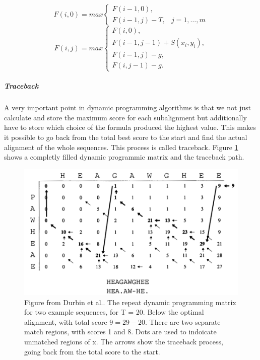 \begin{equation}
F(i,0) = max \left\{ \begin{array}{lr}F(i-1,0),&\\F(i-1,j)-T,& j=1,\dots,m\end{array}\right. 
\label{eq:firstrow}
\end{equation}
\begin{equation}
F(i,j) = max \left\{ \begin{array}{lr}F(i,0),\\F(i-1,j-1)+S(x_i,y_i),\\F(i-1,j)-g,\\F(i,j-1)-g.\end{array}\right.
\label{eq:otherrows}
\end{equation}
		
\subparagraph{Traceback}
A very important point in dynamic programming algorithms is that we not just calculate and store the maximum score for each subalignment but additionally have to store which choice of the formula produced the highest value.
This makes it possible to go back from the total best score to the start and find the actual alignment of the whole sequences. This process is called traceback. 
Figure \ref{fig:durbindpmatrixtraceback} shows a completly filled dynamic programmic matrix and the traceback path.

\begin{figure}
\centering
\includegraphics[scale=0.4]{chapters/approach/smithwatermanrepeated.png}
\caption{Figure from Durbin et al.\cite{durbin1998}. The repeat dynamic programming matrix for two example sequences, for T = 20. Below the optimal alignment, with total score $9 = 29-20$. There are two separate match regions, with scores 1 and 8. Dots are used to indoicate unmatched regions of x. The arrows show the traceback process, going back from the total score to the start.}
\label{fig:durbindpmatrixtraceback}
\end{figure}

